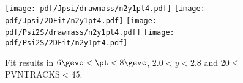 \begin{figure}[H]
\begin{center}
\texttt{[image: pdf/Jpsi/drawmass/n2y1pt4.pdf]}
\texttt{[image: pdf/Jpsi/2DFit/n2y1pt4.pdf]}
\vspace*{-0.5cm}
\texttt{[image: pdf/Psi2S/drawmass/n2y1pt4.pdf]}
\texttt{[image: pdf/Psi2S/2DFit/n2y1pt4.pdf]}
\vspace*{-0.5cm}
\end{center}
\caption{Fit results in $6\gevc<\pt<8\gevc$, $2.0<y<2.8$ and 20$\leq$PVNTRACKS$<$45.}
\label{Fitn2y1pt4}
\end{figure}
